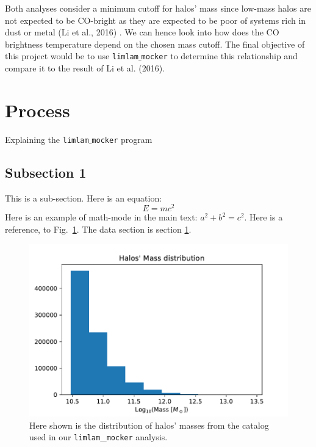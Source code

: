 \documentclass[apj]{emulateapj}
\begin{document}
Both analyses consider a minimum cutoff for halos' mass since low-mass halos are not expected to be CO-bright as they are expected to be poor of systems rich in dust or metal (Li et al., 2016) \cite{Li_2016}. We can hence look into how does the CO brightness temperature depend on the chosen mass cutoff. The final objective of this project would be to use \texttt{limlam$\_$mocker} to determine this relationship and compare it to the result of Li et al. (2016). 


\section{Process}
\label{sec:data}
Explaining the \texttt{limlam$\_$mocker} program


\subsection{Subsection 1}
\label{sec:cmb_data}
This is a sub-section.
Here is an equation:
\begin{equation}
E = mc^2
\label{eq:relativity}
\end{equation}
Here is an example of math-mode in the main text: $a^2 + b^2 = c^2$.  Here is a reference, to Fig.~\ref{fig:figureOfSpectrum}.  The data section is section \ref{sec:data}.


\begin{figure}[!h]
\includegraphics[width=1.05\columnwidth]{mass_distribution.pdf}
\caption{Here shown is the distribution of halos' masses from the catalog used in our \texttt{limlam}\_\texttt{mocker} analysis.\vspace{1mm}}
\label{fig:figureOfSpectrum}
\end{figure}
\end{document}
